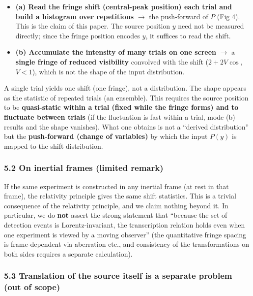 \documentclass[
]{article}
\providecommand{\tightlist}{%
  \setlength{\itemsep}{0pt}\setlength{\parskip}{0pt}}
\begin{document}
\begin{itemize}
\tightlist
\item
  \textbf{(a) Read the fringe shift (central-peak position) each trial
  and build a histogram over repetitions} \(\rightarrow\) the
  push-forward of \(P\) (Fig 4). This is the claim of this paper. The
  source position \(y\) need not be measured directly; since the fringe
  position encodes \(y\), it suffices to read the shift.
\item
  \textbf{(b) Accumulate the intensity of many trials on one screen}
  \(\rightarrow\) a \textbf{single fringe of reduced visibility}
  convolved with the shift (\(2+2V\cos\), \(V<1\)), which is not the
  shape of the input distribution.
\end{itemize}

A single trial yields one shift (one fringe), not a distribution. The
shape appears as the statistic of repeated trials (an ensemble). This
requires the source position to be \textbf{quasi-static within a trial
(fixed while the fringe forms) and to fluctuate between trials} (if the
fluctuation is fast within a trial, mode (b) results and the shape
vanishes). What one obtains is not a ``derived distribution'' but the
\textbf{push-forward (change of variables)} by which the input \(P(y)\)
is mapped to the shift distribution.

\subsubsection{5.2 On inertial frames (limited
remark)}\label{on-inertial-frames-limited-remark}

If the same experiment is constructed in any inertial frame (at rest in
that frame), the relativity principle gives the same shift statistics.
This is a trivial consequence of the relativity principle, and we claim
nothing beyond it. In particular, we do \textbf{not} assert the strong
statement that ``because the set of detection events is
Lorentz-invariant, the transcription relation holds even when one
experiment is viewed by a moving observer'' (the quantitative fringe
spacing is frame-dependent via aberration etc., and consistency of the
transformations on both sides requires a separate calculation).

\subsubsection{5.3 Translation of the source itself is a separate
problem (out of
scope)}\label{translation-of-the-source-itself-is-a-separate-problem-out-of-scope}
\end{document}
